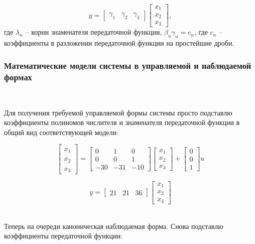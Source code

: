 \documentclass[a4paper]{article}
\begin{document}
$$
y = \begin{bmatrix}
    \gamma_1 & \gamma_2 & \gamma_3
\end{bmatrix}\begin{bmatrix}
    x_1 \\
    x_2 \\
    x_3
\end{bmatrix},
$$
где $\lambda_n$ -- корни знаменателя передаточной функции, $\beta_n\gamma_n = c_n$, где $c_n$ -- коэффициенты в разложении передаточной функции на простейшие дроби.

\subsubsection{Математические модели системы в управляемой и наблюдаемой формах}\ 

Для получения требуемой управляемой формы системы просто подставлю коэффициенты полиномов числителя и знаменателя передаточной функции в общий вид соответствующей модели:

$$
\begin{bmatrix}
    \dot{x_1} \\
    \dot{x_2} \\
    \dot{x_3}
\end{bmatrix} = \begin{bmatrix}
    0 & 1 & 0 \\ 
    0 & 0 & 1 \\
    -30 & -31 & -10
\end{bmatrix}\begin{bmatrix}
    x_1 \\
    x_2 \\
    x_3
\end{bmatrix} + \begin{bmatrix}
    0 \\ 
    0 \\ 
    1
\end{bmatrix}u
$$

$$
y = \begin{bmatrix}
    21 & 21 & 36
\end{bmatrix}\begin{bmatrix}
    x_1 \\
    x_2 \\
    x_3
\end{bmatrix}
$$\

Теперь на очереди каноническая наблюдаемая форма. Снова подставлю коэффициенты передаточной функции:
\end{document}
